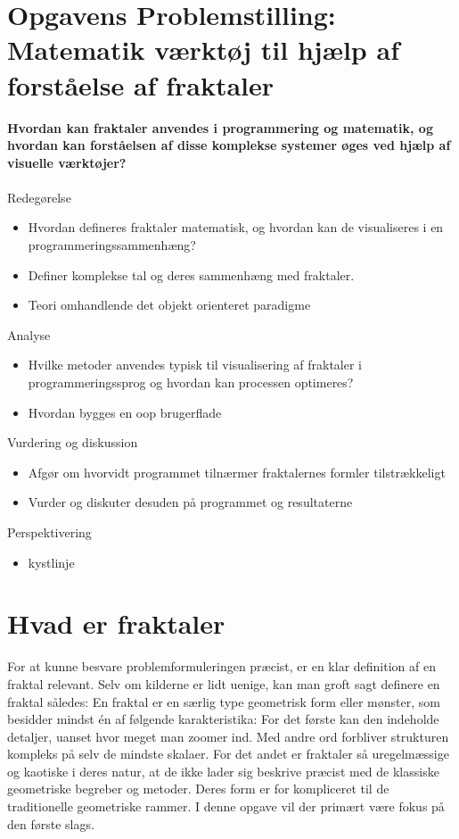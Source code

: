 \documentclass{article}
\begin{document}
\section*{Opgavens Problemstilling: Matematik værktøj til hjælp af forståelse af fraktaler}
\textbf{Hvordan kan fraktaler anvendes i programmering og matematik, og hvordan kan forståelsen af disse komplekse systemer øges ved hjælp af visuelle værktøjer?}\\\\
Redegørelse
\begin{itemize}
    \item Hvordan defineres fraktaler matematisk, og hvordan kan de visualiseres i en programmeringssammenhæng?
    \item Definer komplekse tal og deres sammenhæng med fraktaler.
    \item Teori omhandlende det objekt orienteret paradigme
\end{itemize}
Analyse
\begin{itemize}
    \item Hvilke metoder anvendes typisk til visualisering af fraktaler i programmeringssprog og hvordan kan processen optimeres?
    \item Hvordan bygges en oop brugerflade
\end{itemize}
Vurdering og diskussion
\begin{itemize}
    \item Afgør om hvorvidt programmet tilnærmer fraktalernes formler tilstrækkeligt
    \item Vurder og diskuter desuden på programmet og resultaterne
\end{itemize}
Perspektivering
\begin{itemize}
    \item kystlinje
\end{itemize}

\newpage

\section{Hvad er fraktaler}
For at kunne besvare problemformuleringen præcist, er en klar definition af en fraktal relevant. Selv om kilderne er lidt uenige, kan man groft sagt definere en fraktal således: En fraktal er en særlig type geometrisk form eller mønster, som besidder mindst én af følgende karakteristika: For det første kan den indeholde detaljer, uanset hvor meget man zoomer ind. Med andre ord forbliver strukturen kompleks på selv de mindste skalaer. For det andet er fraktaler så uregelmæssige og kaotiske i deres natur, at de ikke lader sig beskrive præcist med de klassiske geometriske begreber og metoder. Deres form er for kompliceret til de traditionelle geometriske rammer. I denne opgave vil der primært være fokus på den første slags.\parencite{vestergaard}\\
\end{document}

